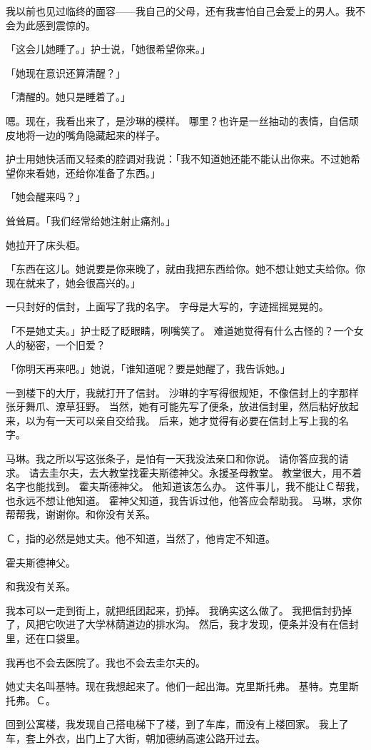 \documentclass[UTF8]{ctexart}
\begin{document}
我以前也见过临终的面容——我自己的父母，还有我害怕自己会爱上的男人。我不会为此感到震惊的。

「这会儿她睡了。」护士说，「她很希望你来。」

「她现在意识还算清醒？」

「清醒的。她只是睡着了。」

嗯。现在，我看出来了，是沙琳的模样。
哪里？也许是一丝抽动的表情，自信顽皮地将一边的嘴角隐藏起来的样子。

护士用她快活而又轻柔的腔调对我说：「我不知道她还能不能认出你来。不过她希望你来看她，还给你准备了东西。」

「她会醒来吗？」

耸耸肩。「我们经常给她注射止痛剂。」

她拉开了床头柜。

「东西在这儿。她说要是你来晚了，就由我把东西给你。她不想让她丈夫给你。你现在就来了，她会很高兴的。」

一只封好的信封，上面写了我的名字。
字母是大写的，字迹摇摇晃晃的。

「不是她丈夫。」护士眨了眨眼睛，咧嘴笑了。
难道她觉得有什么古怪的？一个女人的秘密，一个旧爱？

「你明天再来吧。」她说，「谁知道呢？要是她醒了，我告诉她。」

一到楼下的大厅，我就打开了信封。
沙琳的字写得很规矩，不像信封上的字那样张牙舞爪、潦草狂野。
当然，她有可能先写了便条，放进信封里，然后粘好放起来，以为有一天可以亲自交给我。
后来，她才觉得有必要在信封上写上我的名字。

马琳。我之所以写这张条子，是怕有一天我没法亲口和你说。
请你答应我的请求。
请去圭尔夫，去大教堂找霍夫斯德神父。永援圣母教堂。
教堂很大，用不着名字也能找到。
霍夫斯德神父。
他知道该怎么办。
这件事儿，我不能让Ｃ帮我，也永远不想让他知道。
霍神父知道，我告诉过他，他答应会帮助我。
马琳，求你帮帮我，谢谢你。和你没有关系。

Ｃ，指的必然是她丈夫。他不知道，当然了，他肯定不知道。

霍夫斯德神父。

和我没有关系。

我本可以一走到街上，就把纸团起来，扔掉。
我确实这么做了。
我把信封扔掉了，风把它吹进了大学林荫道边的排水沟。
然后，我才发现，便条并没有在信封里，还在口袋里。

我再也不会去医院了。我也不会去圭尔夫的。

她丈夫名叫基特。现在我想起来了。他们一起出海。克里斯托弗。
基特。克里斯托弗。Ｃ。

回到公寓楼，我发现自己搭电梯下了楼，到了车库，而没有上楼回家。
我上了车，套上外衣，出门上了大街，朝加德纳高速公路开过去。
\end{document}

